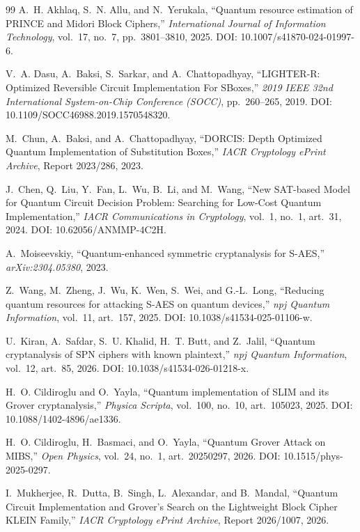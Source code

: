 \documentclass[pdflatex,sn-nature]{sn-jnl}
\theoremstyle{thmstyleone}
\theoremstyle{thmstyletwo}
\begin{document}
\begin{thebibliography}{99}
A.~H. Akhlaq, S.~N. Allu, and N.~Yerukala,
``Quantum resource estimation of PRINCE and Midori Block Ciphers,''
\emph{International Journal of Information Technology}, vol.~17, no.~7, pp.~3801--3810, 2025.
DOI: 10.1007/s41870-024-01997-6.

V.~A. Dasu, A.~Baksi, S.~Sarkar, and A.~Chattopadhyay,
``LIGHTER-R: Optimized Reversible Circuit Implementation For SBoxes,''
\emph{2019 IEEE 32nd International System-on-Chip Conference (SOCC)}, pp.~260--265, 2019.
DOI: 10.1109/SOCC46988.2019.1570548320.

M.~Chun, A.~Baksi, and A.~Chattopadhyay,
``DORCIS: Depth Optimized Quantum Implementation of Substitution Boxes,''
\emph{IACR Cryptology ePrint Archive}, Report 2023/286, 2023.

J.~Chen, Q.~Liu, Y.~Fan, L.~Wu, B.~Li, and M.~Wang,
``New SAT-based Model for Quantum Circuit Decision Problem: Searching for Low-Cost Quantum Implementation,''
\emph{IACR Communications in Cryptology}, vol.~1, no.~1, art.~31, 2024.
DOI: 10.62056/ANMMP-4C2H.

A.~Moiseevskiy,
``Quantum-enhanced symmetric cryptanalysis for S-AES,''
\emph{arXiv:2304.05380}, 2023.

Z.~Wang, M.~Zheng, J.~Wu, K.~Wen, S.~Wei, and G.-L.~Long,
``Reducing quantum resources for attacking S-AES on quantum devices,''
\emph{npj Quantum Information}, vol.~11, art.~157, 2025.
DOI: 10.1038/s41534-025-01106-w.

U.~Kiran, A.~Safdar, S.~U. Khalid, H.~T. Butt, and Z.~Jalil,
``Quantum cryptanalysis of SPN ciphers with known plaintext,''
\emph{npj Quantum Information}, vol.~12, art.~85, 2026.
DOI: 10.1038/s41534-026-01218-x.

H.~O. Cildiroglu and O.~Yayla,
``Quantum implementation of SLIM and its Grover cryptanalysis,''
\emph{Physica Scripta}, vol.~100, no.~10, art.~105023, 2025.
DOI: 10.1088/1402-4896/ae1336.

H.~O. Cildiroglu, H.~Basmaci, and O.~Yayla,
``Quantum Grover Attack on MIBS,''
\emph{Open Physics}, vol.~24, no.~1, art.~20250297, 2026.
DOI: 10.1515/phys-2025-0297.

I.~Mukherjee, R.~Dutta, B.~Singh, L.~Alexandar, and B.~Mandal,
``Quantum Circuit Implementation and Grover's Search on the Lightweight Block Cipher KLEIN Family,''
\emph{IACR Cryptology ePrint Archive}, Report 2026/1007, 2026.


\end{thebibliography}
\end{document}
